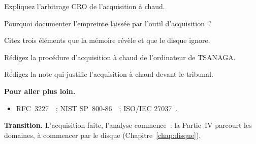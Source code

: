 \begin{boxexo}[title={\ding{45}\quad Exercice~9.6. CRO \niveaumoyen}]
Expliquez l'arbitrage CRO de l'acquisition à chaud.
\end{boxexo}

\begin{boxexo}[title={\ding{45}\quad Exercice~9.7. Empreinte \niveaumoyen}]
Pourquoi documenter l'empreinte laissée par l'outil d'acquisition~?
\end{boxexo}

\begin{boxexo}[title={\ding{45}\quad Exercice~9.8. Ce que révèle la mémoire \niveaumoyen}]
Citez trois éléments que la mémoire révèle et que le disque ignore.
\end{boxexo}

\begin{boxexo}[title={\ding{45}\quad Exercice~9.9. Procédure \niveauexpert}]
Rédigez la procédure d'acquisition à chaud de l'ordinateur de TSANAGA.
\end{boxexo}

\begin{boxexo}[title={\ding{45}\quad Exercice~9.10. Justification \niveauexpert}]
Rédigez la note qui justifie l'acquisition à chaud devant le tribunal.
\end{boxexo}

\bigskip

\begin{boxinfo}
\textbf{Pour aller plus loin.}
\begin{itemize}
    \item RFC~3227~\cite{rfc3227}~; NIST SP~800-86~\cite{nist80086}~;
          ISO/IEC 27037~\cite{iso27037}.
\end{itemize}
\end{boxinfo}

\begin{boxinfo}
\textbf{Transition.} L'acquisition faite, l'analyse commence~: la Partie~IV
parcourt les domaines, à commencer par le disque
(Chapitre~\ref{chap:disque}).
\end{boxinfo}
